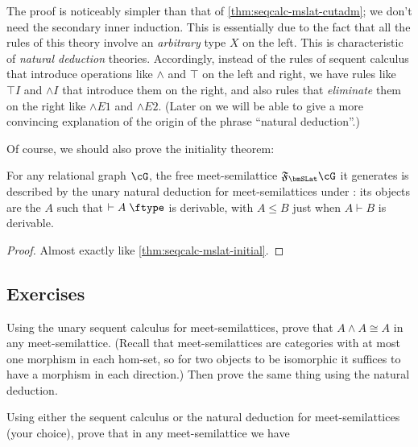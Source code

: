\documentclass{book}
\let\types\vdash
\def\type{\;\ftype}
\newcommand{\F}[1]{\mathfrak{F}_{#1}}
\let\meet\wedge
\def\meetE{\mathord{\meet}E}
\def\meetI{\mathord{\meet}I}
\begin{document}
The proof is noticeably simpler than that of \cref{thm:seqcalc-mslat-cutadm}; we don't need the secondary inner induction.
This is essentially due to the fact that all the rules of this theory involve an \emph{arbitrary} type $X$ on the left.
This is characteristic of \emph{natural deduction} theories.
Accordingly, instead of the rules of sequent calculus that introduce operations like $\meet$ and $\top$ on the left and right, we have rules like $\top I$ and $\meetI$ that introduce them on the right, and also rules that \emph{eliminate} them on the right like $\meetE1$ and $\meetE2$.
(Later on we will be able to give a more convincing explanation of the origin of the phrase ``natural deduction''.)

Of course, we should also prove the initiality theorem:

\begin{thm}\label{thm:natded-mslat-initial}
  For any relational graph $\cG$, the free meet-semilattice $\F\bmSLat \cG$ it generates is described by the unary natural deduction for meet-semilattices under \cG: its objects are the $A$ such that $\types A\type$ is derivable, with $A\le B$ just when $A\types B$ is derivable.
\end{thm}
\begin{proof}
  Almost exactly like \cref{thm:seqcalc-mslat-initial}.
\end{proof}

\subsection*{Exercises}

\begin{ex}\label{ex:mslat-idem}
  Using the unary sequent calculus for meet-semilattices, prove that $A\meet A \cong A$ in any meet-semilattice.
  (Recall that meet-semilattices are categories with at most one morphism in each hom-set, so for two objects to be isomorphic it suffices to have a morphism in each direction.)
  Then prove the same thing using the natural deduction.
\end{ex}

\begin{ex}\label{ex:mslat-monoid}
  Using either the sequent calculus or the natural deduction for meet-semilattices (your choice), prove that in any meet-semilattice we have
\end{ex}
\end{document}

